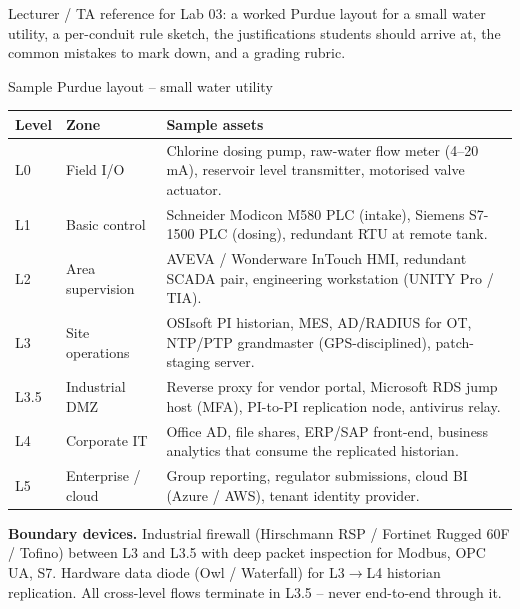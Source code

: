 \documentclass[11pt,a4paper]{article}
\begin{document}
\labheader

\begin{goalbox}
Lecturer / TA reference for Lab 03: a worked Purdue layout for a small water utility, a per-conduit rule sketch, the justifications students should arrive at, the common mistakes to mark down, and a grading rubric.
\end{goalbox}

\begin{solutionbox}{Sample Purdue layout -- small water utility}
\small
\begin{tabular}{@{}p{1.0cm}p{3.4cm}p{10.5cm}@{}}
\toprule
\textbf{Level} & \textbf{Zone} & \textbf{Sample assets}\\
\midrule
L0  & Field I/O                & Chlorine dosing pump, raw-water flow meter (4--20\,mA), reservoir level transmitter, motorised valve actuator.\\
L1  & Basic control            & Schneider Modicon M580 PLC (intake), Siemens S7-1500 PLC (dosing), redundant RTU at remote tank.\\
L2  & Area supervision         & AVEVA / Wonderware InTouch HMI, redundant SCADA pair, engineering workstation (UNITY Pro / TIA).\\
L3  & Site operations          & OSIsoft PI historian, MES, AD/RADIUS for OT, NTP/PTP grandmaster (GPS-disciplined), patch-staging server.\\
L3.5& Industrial DMZ           & Reverse proxy for vendor portal, Microsoft RDS jump host (MFA), PI-to-PI replication node, antivirus relay.\\
L4  & Corporate IT             & Office AD, file shares, ERP/SAP front-end, business analytics that consume the replicated historian.\\
L5  & Enterprise / cloud       & Group reporting, regulator submissions, cloud BI (Azure / AWS), tenant identity provider.\\
\bottomrule
\end{tabular}

\smallskip
\textbf{Boundary devices.} Industrial firewall (Hirschmann RSP / Fortinet Rugged 60F / Tofino) between L3 and L3.5 with deep packet inspection for Modbus, OPC\,UA, S7. Hardware data diode (Owl / Waterfall) for L3$\to$L4 historian replication. All cross-level flows terminate in L3.5 -- never end-to-end through it.
\end{solutionbox}
\end{document}
